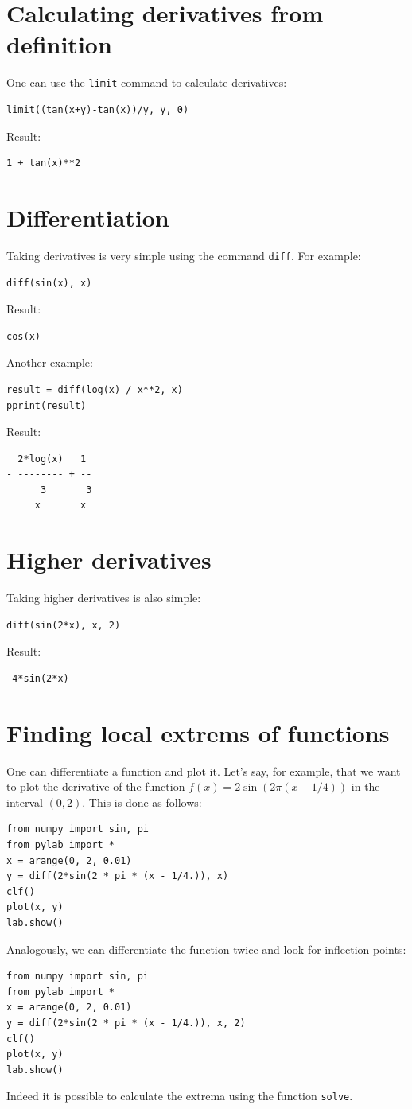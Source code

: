 \documentclass[article,A4,12pt]{llncs}
\begin{document}
\section{Calculating derivatives from definition}

One can use the {\tt limit} command to calculate derivatives:
\begin{verbatim}
limit((tan(x+y)-tan(x))/y, y, 0)
\end{verbatim}
Result:
\begin{verbatim}
1 + tan(x)**2
\end{verbatim}

\section{Differentiation}

Taking derivatives is very simple using the command {\tt diff}. For example:
\begin{verbatim}
diff(sin(x), x)
\end{verbatim}
Result:
\begin{verbatim}
cos(x)
\end{verbatim}
Another example:
\begin{verbatim}
result = diff(log(x) / x**2, x)
pprint(result)
\end{verbatim}
Result:
\begin{verbatim}
  2*log(x)   1 
- -------- + --
      3       3
     x       x 
\end{verbatim}

\section{Higher derivatives}

Taking higher derivatives is also simple:
\begin{verbatim}
diff(sin(2*x), x, 2)
\end{verbatim}
Result:
\begin{verbatim}
-4*sin(2*x)
\end{verbatim}

\section{Finding local extrems of functions}

One can differentiate a function and plot it. Let's say, for example, that 
we want to plot the derivative of the function $f(x) = 2\sin(2\pi(x - 1/4))$
in the interval $(0, 2)$. This is done as follows:
\begin{verbatim}
from numpy import sin, pi
from pylab import *
x = arange(0, 2, 0.01)
y = diff(2*sin(2 * pi * (x - 1/4.)), x)
clf()
plot(x, y)
lab.show()
\end{verbatim}
Analogously, we can differentiate the function twice and look for inflection points:
\begin{verbatim}
from numpy import sin, pi
from pylab import *
x = arange(0, 2, 0.01)
y = diff(2*sin(2 * pi * (x - 1/4.)), x, 2)
clf()
plot(x, y)
lab.show()
\end{verbatim}
Indeed it is possible to calculate the extrema using the function {\tt solve}.
\end{document}
